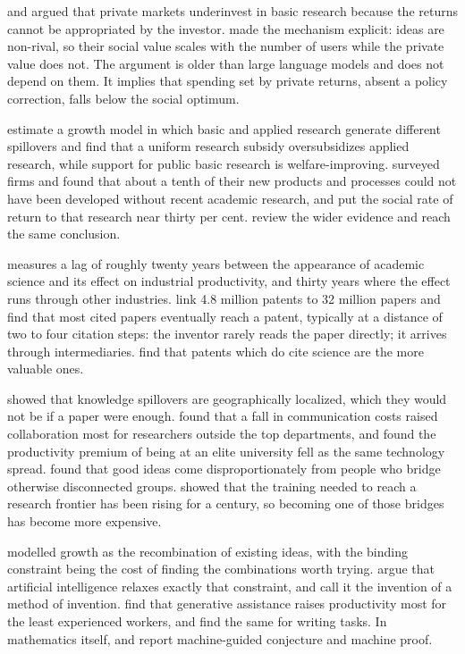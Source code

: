 \documentclass[11pt]{article}
\theoremstyle{definition}
\theoremstyle{remark}
\begin{document}
\citet{nelson1959} and \citet{arrow1962} argued that private markets underinvest in basic research because the returns cannot be appropriated by the investor. \citet{romer1990} made the mechanism explicit: ideas are non-rival, so their social value scales with the number of users while the private value does not. The argument is older than large language models and does not depend on them. It implies that spending set by private returns, absent a policy correction, falls below the social optimum.

\citet{akcigit2021} estimate a growth model in which basic and applied research generate different spillovers and find that a uniform research subsidy oversubsidizes applied research, while support for public basic research is welfare-improving. \citet{mansfield1991} surveyed firms and found that about a tenth of their new products and processes could not have been developed without recent academic research, and put the social rate of return to that research near thirty per cent. \citet{salter2001} review the wider evidence and reach the same conclusion.

\citet{adams1990} measures a lag of roughly twenty years between the appearance of academic science and its effect on industrial productivity, and thirty years where the effect runs through other industries. \citet{ahmadpoor2017} link 4.8 million patents to 32 million papers and find that most cited papers eventually reach a patent, typically at a distance of two to four citation steps: the inventor rarely reads the paper directly; it arrives through intermediaries. \citet{poege2019} find that patents which do cite science are the more valuable ones.

\citet{jaffe1993} showed that knowledge spillovers are geographically localized, which they would not be if a paper were enough. \citet{agrawal2008} found that a fall in communication costs raised collaboration most for researchers outside the top departments, and \citet{kim2009} found the productivity premium of being at an elite university fell as the same technology spread. \citet{burt2004} found that good ideas come disproportionately from people who bridge otherwise disconnected groups. \citet{jones2009} showed that the training needed to reach a research frontier has been rising for a century, so becoming one of those bridges has become more expensive.

\citet{weitzman1998} modelled growth as the recombination of existing ideas, with the binding constraint being the cost of finding the combinations worth trying. \citet{agrawal2019} argue that artificial intelligence relaxes exactly that constraint, and \citet{cockburn2019} call it the invention of a method of invention. \citet{brynjolfsson2025} find that generative assistance raises productivity most for the least experienced workers, and \citet{noy2023} find the same for writing tasks. In mathematics itself, \citet{davies2021} and \citet{trinh2024} report machine-guided conjecture and machine proof.
\end{document}
